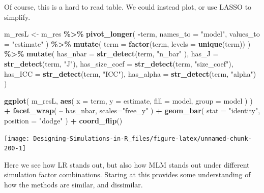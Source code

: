 \documentclass[
]{book}
\newenvironment{Shaded}{\begin{snugshade}}{\end{snugshade}}
\newcommand{\AttributeTok}[1]{\textcolor[rgb]{0.13,0.29,0.53}{#1}}
\newcommand{\FunctionTok}[1]{\textcolor[rgb]{0.13,0.29,0.53}{\textbf{#1}}}
\newcommand{\NormalTok}[1]{#1}
\newcommand{\OtherTok}[1]{\textcolor[rgb]{0.56,0.35,0.01}{#1}}
\newcommand{\SpecialCharTok}[1]{\textcolor[rgb]{0.81,0.36,0.00}{\textbf{#1}}}
\newcommand{\StringTok}[1]{\textcolor[rgb]{0.31,0.60,0.02}{#1}}
\begin{document}
Of course, this is a hard to read table. We could instead plot, or use LASSO to simplify.

\begin{Shaded}
\begin{Highlighting}[]
\NormalTok{m\_resL }\OtherTok{\textless{}{-}}\NormalTok{ m\_res }\SpecialCharTok{\%\textgreater{}\%}
  \FunctionTok{pivot\_longer}\NormalTok{( }\SpecialCharTok{{-}}\NormalTok{term, }
                \AttributeTok{names\_to =} \StringTok{"model"}\NormalTok{, }\AttributeTok{values\_to =} \StringTok{"estimate"}\NormalTok{ ) }\SpecialCharTok{\%\textgreater{}\%}
  \FunctionTok{mutate}\NormalTok{( }\AttributeTok{term =} \FunctionTok{factor}\NormalTok{(term, }\AttributeTok{levels =} \FunctionTok{unique}\NormalTok{(term)) ) }\SpecialCharTok{\%\textgreater{}\%}
  \FunctionTok{mutate}\NormalTok{( }\AttributeTok{has\_nbar =} \FunctionTok{str\_detect}\NormalTok{(term, }\StringTok{"n\_bar"}\NormalTok{ ),}
          \AttributeTok{has\_J =} \FunctionTok{str\_detect}\NormalTok{(term, }\StringTok{"J"}\NormalTok{),}
          \AttributeTok{has\_size\_coef =} \FunctionTok{str\_detect}\NormalTok{(term, }\StringTok{"size\_coef"}\NormalTok{),}
          \AttributeTok{has\_ICC =} \FunctionTok{str\_detect}\NormalTok{(term, }\StringTok{"ICC"}\NormalTok{),}
          \AttributeTok{has\_alpha =} \FunctionTok{str\_detect}\NormalTok{(term, }\StringTok{"alpha"}\NormalTok{) )}

\FunctionTok{ggplot}\NormalTok{( m\_resL,}
        \FunctionTok{aes}\NormalTok{( }\AttributeTok{x =}\NormalTok{ term, }\AttributeTok{y =}\NormalTok{ estimate, }
             \AttributeTok{fill =}\NormalTok{ model, }\AttributeTok{group =}\NormalTok{ model ) ) }\SpecialCharTok{+}
  \FunctionTok{facet\_wrap}\NormalTok{( }\SpecialCharTok{\textasciitilde{}}\NormalTok{ has\_nbar, }\AttributeTok{scales=}\StringTok{"free\_y"}\NormalTok{ ) }\SpecialCharTok{+}
  \FunctionTok{geom\_bar}\NormalTok{( }\AttributeTok{stat =} \StringTok{"identity"}\NormalTok{, }\AttributeTok{position =} \StringTok{"dodge"}\NormalTok{ ) }\SpecialCharTok{+}
  \FunctionTok{coord\_flip}\NormalTok{()}
\end{Highlighting}
\end{Shaded}

\begin{center}\texttt{[image: Designing-Simulations-in-R\_files/figure-latex/unnamed-chunk-200-1]} \end{center}

Here we see how LR stands out, but also how MLM stands out under different simulation factor combinations.
Staring at this provides some understanding of how the methods are similar, and dissimilar.
\end{document}
